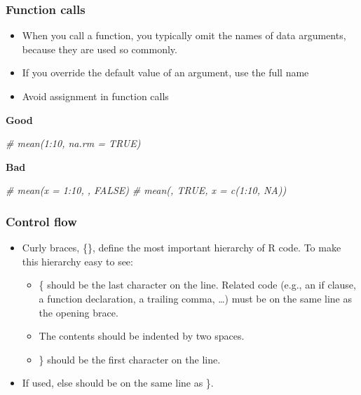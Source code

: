 \documentclass[
]{article}
\newenvironment{Shaded}{\begin{snugshade}}{\end{snugshade}}
\newcommand{\CommentTok}[1]{\textcolor[rgb]{0.56,0.35,0.01}{\textit{#1}}}
\providecommand{\tightlist}{%
  \setlength{\itemsep}{0pt}\setlength{\parskip}{0pt}}
\begin{document}
\begin{Shaded}
\end{Shaded}

\hypertarget{function-calls}{%
\subsubsection{Function calls}\label{function-calls}}

\begin{itemize}
\tightlist
\item
  When you call a function, you typically omit the names of data
  arguments, because they are used so commonly.
\item
  If you override the default value of an argument, use the full name
\item
  Avoid assignment in function calls
\end{itemize}

\textbf{Good}

\begin{Shaded}
\begin{Highlighting}[]
\CommentTok{# mean(1:10, na.rm = TRUE)}
\end{Highlighting}
\end{Shaded}

\textbf{Bad}

\begin{Shaded}
\begin{Highlighting}[]
\CommentTok{# mean(x = 1:10, , FALSE)}
\CommentTok{# mean(, TRUE, x = c(1:10, NA))}
\end{Highlighting}
\end{Shaded}

\hypertarget{control-flow}{%
\subsubsection{Control flow}\label{control-flow}}

\begin{itemize}
\tightlist
\item
  Curly braces, \{\}, define the most important hierarchy of R code. To
  make this hierarchy easy to see:

  \begin{itemize}
  \tightlist
  \item
    \{ should be the last character on the line. Related code (e.g., an
    if clause, a function declaration, a trailing comma, \ldots) must be
    on the same line as the opening brace.
  \item
    The contents should be indented by two spaces.
  \item
    \} should be the first character on the line.
  \end{itemize}
\item
  If used, else should be on the same line as \}.
\end{itemize}
\end{document}
